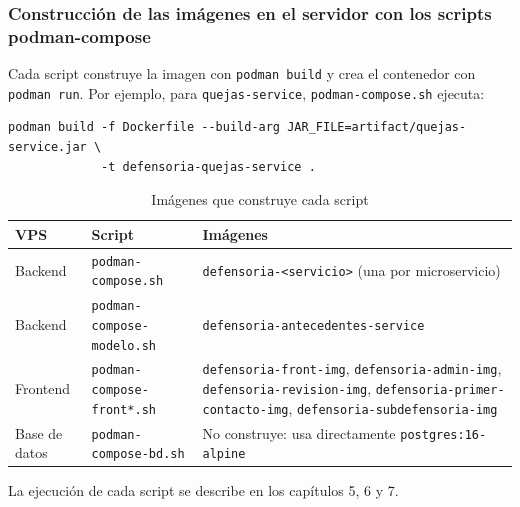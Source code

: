 \subsubsection{Construcción de las imágenes en el servidor con los scripts podman-compose}\label{sec:4_3_4_build}
Cada script construye la imagen con \texttt{podman build} y crea el contenedor con \texttt{podman run}. Por ejemplo, para \texttt{quejas-service}, \texttt{podman-compose.sh} ejecuta:
\begin{lstlisting}
podman build -f Dockerfile --build-arg JAR_FILE=artifact/quejas-service.jar \
             -t defensoria-quejas-service .
\end{lstlisting}
\begin{table}[H]
\centering
\caption{Imágenes que construye cada script}
\small
\begin{tabular}{p{2.2cm}p{4.6cm}p{7.6cm}}
\toprule
\textbf{VPS} & \textbf{Script} & \textbf{Imágenes} \\
\midrule
Backend & \texttt{podman-compose.sh} & \texttt{defensoria-<servicio>} (una por microservicio) \\
Backend & \texttt{podman-compose-modelo.sh} & \texttt{defensoria-antecedentes-service} \\
Frontend & \texttt{podman-compose-front*.sh} & \texttt{defensoria-front-img}, \texttt{defensoria-admin-img}, \texttt{defensoria-revision-img}, \texttt{defensoria-primer-contacto-img}, \texttt{defensoria-subdefensoria-img} \\
Base de datos & \texttt{podman-compose-bd.sh} & No construye: usa directamente \texttt{postgres:16-alpine} \\
\bottomrule
\end{tabular}
\end{table}
La ejecución de cada script se describe en los capítulos 5, 6 y 7.
